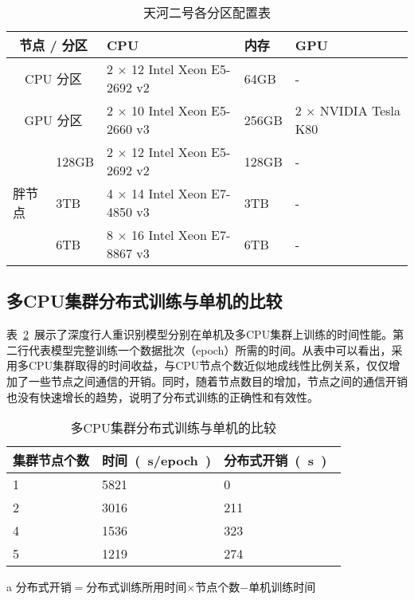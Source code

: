 \begin{table}[!ht]
\centering
\caption{天河二号各分区配置表}
\label{tab:tianheconfig}
\begin{tabularx}{\textwidth}{p{}<{\centering}p{}<{\centering}p{}<{\centering}p{}<{\centering}p{}<{\centering}}
\toprule
\multicolumn{2}{c}{节点 / 分区}  & CPU                          & 内存    & GPU                  \\ \midrule
\multicolumn{2}{c}{CPU 分区}  & 2 $\times$ 12 Intel Xeon E5-2692 v2 & 64GB  & -                    \\
\multicolumn{2}{c}{GPU 分区}  & 2 $\times$ 10 Intel Xeon E5-2660 v3 & 256GB & 2 $\times$ NVIDIA Tesla K80 \\
\multirow{3}{*}{胖节点} & 128GB & 2 $\times$ 12 Intel Xeon E5-2692 v2 & 128GB & -                    \\
                        & 3TB   & 4 $\times$ 14 Intel Xeon E7-4850 v3 & 3TB   & -                    \\
                        & 6TB   & 8 $\times$ 16 Intel Xeon E7-8867 v3 & 6TB   & -                    \\ \bottomrule
\end{tabularx}
\end{table}

\subsection{多CPU集群分布式训练与单机的比较}

表~\ref{tab:comp1}~展示了深度行人重识别模型分别在单机及多CPU集群上训练的时间性能。第二行代表模型完整训练一个数据批次（epoch）所需的时间。从表中可以看出，采用多CPU集群取得的时间收益，与CPU节点个数近似地成线性比例关系，仅仅增加了一些节点之间通信的开销。同时，随着节点数目的增加，节点之间的通信开销也没有快速增长的趋势，说明了分布式训练的正确性和有效性。

\begin{table}[!ht]
    \centering
    \caption{多CPU集群分布式训练与单机的比较}
    \label{tab:comp1}
    \begin{threeparttable}
    \begin{tabularx}{\textwidth}{X<{\centering}X<{\centering}X<{\centering}}
    \toprule
    集群节点个数 & 时间~(~s/epoch~) & 分布式开销~(~s~)~\tnote{a} \\ \midrule
    1 & 5821 & 0   \\
    2 & 3016 & 211 \\
    4 & 1536 & 323 \\
    5 & 1219 & 274 \\ \bottomrule
    \end{tabularx}
    \begin{tablenotes}
        \footnotesize
        \item[a] 分布式开销$=$分布式训练所用时间$\times$节点个数$-$单机训练时间
    \end{tablenotes}
    \end{threeparttable}
\end{table}

